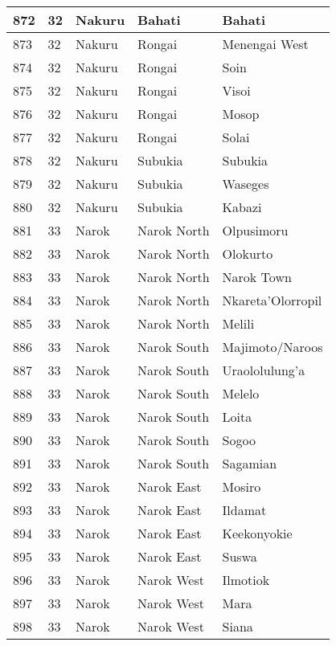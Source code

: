 \begin{table}[!ht]
\begin{tabular}{|l|l|l|l|l|}
        872 & 32 & Nakuru & Bahati & Bahati \\ \hline
        873 & 32 & Nakuru & Rongai & Menengai West \\ \hline
        874 & 32 & Nakuru & Rongai & Soin \\ \hline
        875 & 32 & Nakuru & Rongai & Visoi \\ \hline
        876 & 32 & Nakuru & Rongai & Mosop \\ \hline
        877 & 32 & Nakuru & Rongai & Solai \\ \hline
        878 & 32 & Nakuru & Subukia & Subukia \\ \hline
        879 & 32 & Nakuru & Subukia & Waseges \\ \hline
        880 & 32 & Nakuru & Subukia & Kabazi \\ \hline
        881 & 33 & Narok & Narok North & Olpusimoru \\ \hline
        882 & 33 & Narok & Narok North & Olokurto \\ \hline
        883 & 33 & Narok & Narok North & Narok Town \\ \hline
        884 & 33 & Narok & Narok North & Nkareta’Olorropil \\ \hline
        885 & 33 & Narok & Narok North & Melili \\ \hline
        886 & 33 & Narok & Narok South & Majimoto/Naroos \\ \hline
        887 & 33 & Narok & Narok South & Uraololulung’a \\ \hline
        888 & 33 & Narok & Narok South & Melelo \\ \hline
        889 & 33 & Narok & Narok South & Loita \\ \hline
        890 & 33 & Narok & Narok South & Sogoo \\ \hline
        891 & 33 & Narok & Narok South & Sagamian \\ \hline
        892 & 33 & Narok & Narok East & Mosiro \\ \hline
        893 & 33 & Narok & Narok East & Ildamat \\ \hline
        894 & 33 & Narok & Narok East & Keekonyokie \\ \hline
        895 & 33 & Narok & Narok East & Suswa \\ \hline
        896 & 33 & Narok & Narok West & Ilmotiok \\ \hline
        897 & 33 & Narok & Narok West & Mara \\ \hline
        898 & 33 & Narok & Narok West & Siana \\ \hline

\end{tabular}
\end{table}
